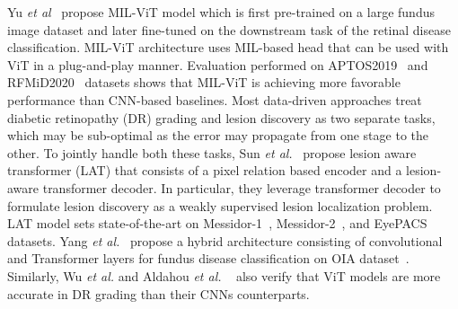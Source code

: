 \documentclass[10pt,journal,compsoc]{IEEEtran}
\begin{document}
Yu \textit{et al}~\cite{yu2021mil} propose MIL-ViT model which is first pre-trained on a large fundus image dataset and later fine-tuned on the downstream task of the retinal disease classification. MIL-ViT architecture uses MIL-based head that can be used with ViT in a plug-and-play manner. Evaluation performed on APTOS2019~\cite{aptos19} and RFMiD2020~\cite{quellec2020automatic} datasets shows that MIL-ViT is achieving more favorable performance than CNN-based baselines.
Most data-driven approaches treat diabetic retinopathy (DR) grading and lesion discovery as two separate tasks, which may be sub-optimal as the error may propagate from one stage to the other. To jointly handle both these tasks, Sun \textit{et al.}~\cite{sun2021lesion} propose lesion aware transformer (LAT) that consists of a pixel relation based encoder and a lesion-aware transformer decoder. In particular, they leverage transformer decoder to formulate lesion discovery as a weakly supervised lesion localization problem. LAT model sets state-of-the-art on Messidor-1~\cite{decenciere2014feedback}, Messidor-2~\cite{decenciere2014feedback}, and EyePACS~\cite{cuadros2009eyepacs} datasets.
Yang \textit{et al.}~\cite{yang2021fundus} propose a hybrid architecture consisting of convolutional and Transformer layers for fundus disease classification on OIA dataset~\cite{nankaioia}. Similarly, Wu \textit{et al.}\cite{wu2021vision} and Aldahou \textit{et al.} ~\cite{aldahoul2021encoding} also verify that ViT models are more accurate in DR grading than their CNNs counterparts. 
\end{document}
